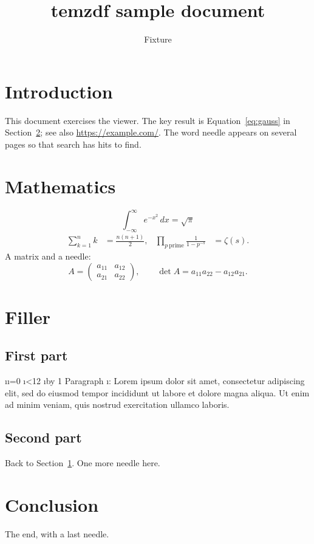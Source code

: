 \documentclass[11pt]{article}
\title{temzdf sample document}
\author{Fixture}
\date{}
\begin{document}
\maketitle
\tableofcontents
\section{Introduction}\label{sec:intro}
This document exercises the viewer. The key result is Equation~\eqref{eq:gauss}
in Section~\ref{sec:math}; see also \url{https://example.com/}.
The word needle appears on several pages so that search has hits to find.
\section{Mathematics}\label{sec:math}
\begin{equation}\label{eq:gauss}
  \int_{-\infty}^{\infty} e^{-x^2}\,dx = \sqrt{\pi}
\end{equation}
\begin{align}
  \sum_{k=1}^{n} k &= \frac{n(n+1)}{2}, &
  \prod_{p\ \text{prime}} \frac{1}{1-p^{-s}} &= \zeta(s).
\end{align}
A matrix and a needle:
\[
  A = \begin{pmatrix} a_{11} & a_{12} \\ a_{21} & a_{22} \end{pmatrix},\qquad
  \det A = a_{11}a_{22} - a_{12}a_{21}.
\]
\newpage
\section{Filler}\label{sec:filler}
\subsection{First part}
\newcount\i \i=0
\loop\ifnum\i<12 \advance\i by 1
Paragraph \the\i: Lorem ipsum dolor sit amet, consectetur adipiscing elit,
sed do eiusmod tempor incididunt ut labore et dolore magna aliqua.
Ut enim ad minim veniam, quis nostrud exercitation ullamco laboris.\par
\repeat
\subsection{Second part}
Back to Section~\ref{sec:intro}. One more needle here.
\newpage
\section{Conclusion}\label{sec:conclusion}
The end, with a last needle.
\end{document}
